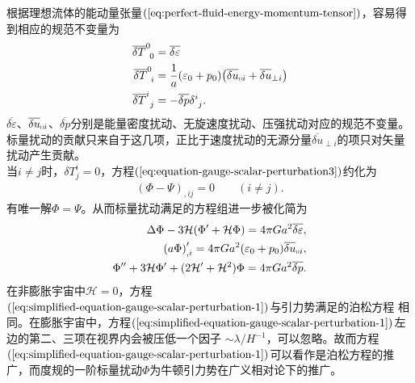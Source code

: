 根据理想流体的能动量张量$(\ref{eq:perfect-fluid-energy-momentum-tensor})$，容易得到相应的规范不变量为
\begin{align}
  \label{eq:perfect-fluid-gauge-invariant-variable}
  \overline{\delta{T}}^{0}_{\ 0} &= \overline{\delta{\varepsilon}} \\
  \overline{\delta{T}}^{0}_{\ i} &=
  \frac{1}{a}(\varepsilon_0+p_0){\left(\overline{\delta{u}}_{\shortparallel
        i}+\overline{\delta{u}}_{\perp i}\right)} \\
  \overline{\delta{T}}^{i}_{\ j}&= -\overline{\delta{p}}\delta^{i}_{\ j}.
\end{align}
$\overline{\delta{\varepsilon}}$、$\overline{\delta{u}}_{\shortparallel
i}$、$\overline{\delta{p}}$分别是能量密度扰动、无旋速度扰动、压强扰动对应的规范不变量。
标量扰动的贡献只来自于这几项，正比于速度扰动的无源分量$\overline{\delta{u}}_{\perp
i}$的项只对矢量扰动产生贡献。\\
当$i\neq
j$时，$\delta{T}^{i}_{j}=0$，方程$(\ref{eq:equation-gauge-scalar-perturbation3})$约化为
\begin{align}
  {\left(\Phi-\Psi\right)}_{,ij}=0\qquad (i\neq j).
\end{align}
有唯一解$\Phi=\Psi$。从而标量扰动满足的方程组进一步被化简为
\begin{align}
  \Delta \Phi -3\mathcal{H}{\left(\Phi^\prime+\mathcal{H}\Phi\right)} =
  4\pi Ga^2\overline{\delta{\varepsilon}},
  \label{eq:simplified-equation-gauge-scalar-perturbation-1} \\
  {\left(a\Phi\right)}^{\prime}_{,i}=4\pi
  Ga^2{\left(\varepsilon_0+p_0\right)}\overline{\delta{u}}_{\shortparallel i},
  \label{eq:simplified-equation-gauge-scalar-perturbation-2} \\
  \Phi^{\prime\prime}+3\mathcal{H}\Phi^\prime+(2\mathcal{H}^{\prime}+\mathcal{H}^2)\Phi=
  4\pi Ga^2\overline{\delta{p}}.
  \label{eq:simplified-equation-gauge-scalar-perturbation-3}
\end{align}
在非膨胀宇宙中$\mathcal{H}=0$，方程$(\ref{eq:simplified-equation-gauge-scalar-perturbation-1})$与引力势满足的泊松方程
相同。在膨胀宇宙中，方程$(\ref{eq:simplified-equation-gauge-scalar-perturbation-1})$左边的第二、三项在视界内会被压低一个因子
$\sim\lambda
/H^{-1}$，可以忽略。故而方程$(\ref{eq:simplified-equation-gauge-scalar-perturbation-1})$可以看作是泊松方程的推广，而度规的一阶标量扰动$\Phi$为牛顿引力势在广义相对论下的推广。

